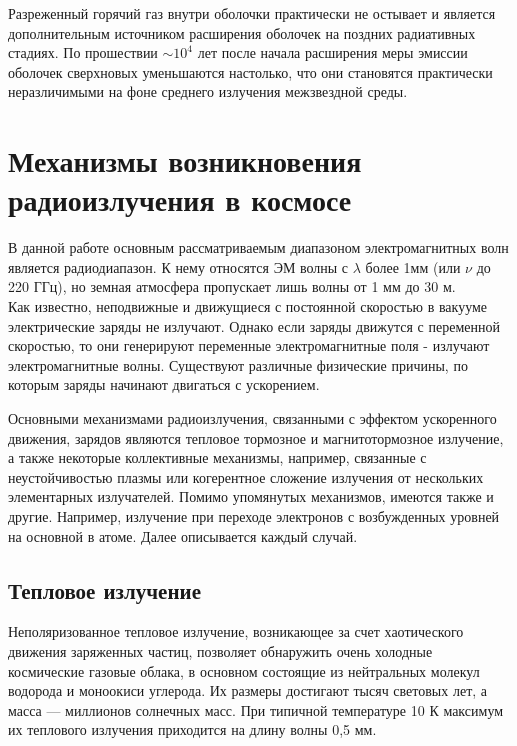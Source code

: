 \documentclass[a4paper,12pt]{extarticle}
\begin{document}
Разреженный горячий газ внутри оболочки практически не остывает и является дополнительным источником расширения оболочек на поздних радиативных стадиях. По прошествии $\sim 10^4$ лет после начала расширения меры эмиссии оболочек сверхновых уменьшаются настолько, что они становятся практически неразличимыми на фоне среднего излучения межзвездной среды.
\section{Механизмы возникновения радиоизлучения в космосе}
В данной работе основным рассматриваемым диапазоном электромагнитных волн является радиодиапазон.
К нему относятся ЭМ волны с $\lambda$ более 1мм (или $\nu$ до 220 ГГц), но земная атмосфера пропускает лишь волны от 1 мм до 30 м. \cite{elementyRadioMicro, Levin2009} \\
Как известно, неподвижные и движущиеся с постоянной скоростью в вакууме электрические заряды не излучают. Однако если заряды движутся с переменной скоростью, то они генерируют переменные электромагнитные поля - излучают электромагнитные волны. Существуют различные физические причины, по которым заряды начинают двигаться с ускорением. {\cite{Kaplan1966,GFF1983}}

Основными механизмами радиоизлучения, связанными с эффектом ускоренного движения, зарядов являются тепловое тормозное и магнитотормозное излучение, а также некоторые коллективные механизмы, например, связанные с неустойчивостью плазмы или когерентное сложение излучения от нескольких элементарных излучателей. 
Помимо упомянутых механизмов, имеются также и другие. Например, излучение при переходе электронов с возбужденных уровней на основной в атоме. 
Далее описывается каждый случай.

\subsection{Тепловое излучение}  
Неполяризованное тепловое излучение, возникающее за счет хаотического движения заряженных частиц, позволяет обнаружить очень холодные космические газовые облака, в основном состоящие из нейтральных молекул водорода и моноокиси углерода. Их размеры достигают тысяч световых лет, а масса — миллионов солнечных масс. При типичной температуре 10 К максимум их теплового излучения приходится на длину волны 0,5 мм. 
\end{document}
